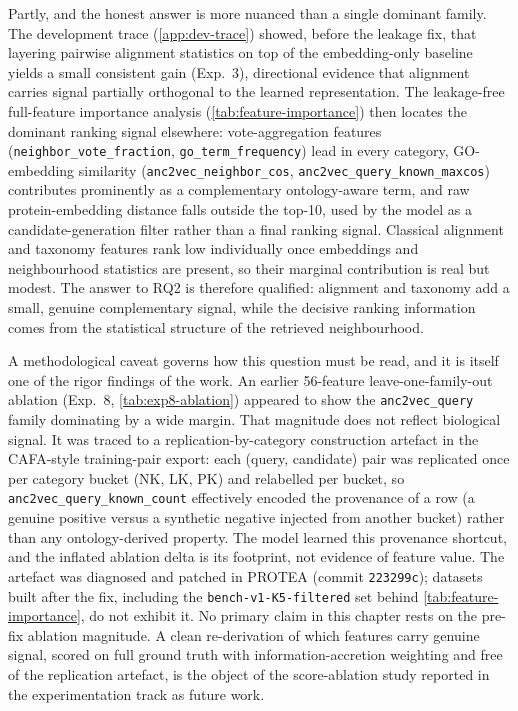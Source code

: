 Partly, and the honest answer is more nuanced than a single dominant family.
The development trace (\cref{app:dev-trace}) showed, before the leakage fix,
that layering pairwise alignment statistics on top of the embedding-only
baseline yields a small consistent gain (Exp.~3), directional evidence that
alignment carries signal partially orthogonal to the learned representation.
The leakage-free full-feature
importance analysis (\cref{tab:feature-importance}) then locates the dominant
ranking signal elsewhere: vote-aggregation features
(\texttt{neighbor\_vote\_fraction}, \texttt{go\_term\_frequency}) lead in every
category, GO-embedding similarity (\texttt{anc2vec\_neighbor\_cos},
\texttt{anc2vec\_query\_known\_maxcos}) contributes prominently as a
complementary ontology-aware term, and raw protein-embedding distance falls
outside the top-10, used by the model as a candidate-generation filter rather
than a final ranking signal. Classical alignment and taxonomy features rank
low individually once embeddings and neighbourhood statistics are present, so
their marginal contribution is real but modest. The answer to RQ2 is therefore
qualified: alignment and taxonomy add a small, genuine complementary signal,
while the decisive ranking information comes from the statistical structure of
the retrieved neighbourhood.

A methodological caveat governs how this question must be read, and it is
itself one of the rigor findings of the work. An earlier 56-feature
leave-one-family-out ablation (Exp.~8, \cref{tab:exp8-ablation}) appeared to
show the \texttt{anc2vec\_query} family dominating by a wide margin. That
magnitude does not reflect biological signal. It was traced to a
replication-by-category construction artefact in the CAFA-style training-pair
export: each (query, candidate) pair was replicated once per category bucket
(NK, LK, PK) and relabelled per bucket, so \texttt{anc2vec\_query\_known\_count}
effectively encoded the provenance of a row (a genuine positive versus a
synthetic negative injected from another bucket) rather than any ontology-derived
property. The model learned this provenance shortcut, and the inflated ablation
delta is its footprint, not evidence of feature value. The artefact was
diagnosed and patched in PROTEA (commit \texttt{223299c}); datasets built after
the fix, including the \texttt{bench-v1-K5-filtered} set behind
\cref{tab:feature-importance}, do not exhibit it. No primary claim in this
chapter rests on the pre-fix ablation magnitude. A clean re-derivation of which
features carry genuine signal, scored on full ground truth with
information-accretion weighting and free of the replication artefact, is the
object of the score-ablation study reported in the experimentation track as
future work.

